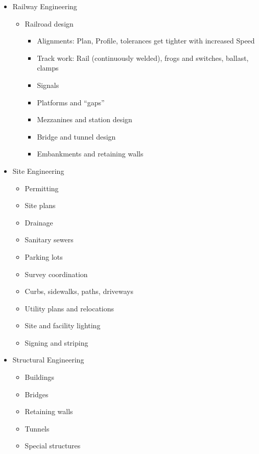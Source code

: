 \documentclass{article}
\begin{document}
\begin{itemize}
\begin{itemize}
        \item Railway Engineering
        \begin{itemize}
            \item Railroad design
            \begin{itemize}
                \item Alignments: Plan, Profile, tolerances get tighter with increased Speed
                \item Track work: Rail (continuously welded), frogs and switches, ballast, clamps
                \item Signals
                \item Platforms and ``gaps''
                \item Mezzanines and station design
                \item Bridge and tunnel design
                \item Embankments and retaining walls
            \end{itemize}
        \end{itemize}
        \item Site Engineering
        \begin{itemize}
            \item Permitting
            \item Site plans
            \item Drainage
            \item Sanitary sewers
            \item Parking lots
            \item Survey coordination
            \item Curbs, sidewalks, paths, driveways
            \item Utility plans and relocations
            \item Site and facility lighting
            \item Signing and striping
        \end{itemize}
        \item Structural Engineering
        \begin{itemize}
            \item Buildings
            \item Bridges
            \item Retaining walls
            \item Tunnels
            \item Special structures
            \begin{itemize}

\end{itemize}
\end{itemize}
\end{itemize}
\end{itemize}
\end{document}
